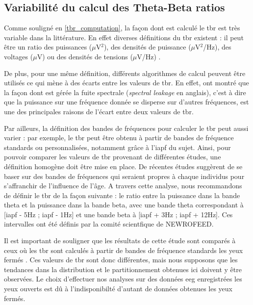 \subsection{Variabilité du calcul des Theta-Beta ratios} 

Comme souligné en \ref{tbr_computation}, la façon dont est calculé le \gls{tbr} est très variable dans la littérature. En effet diverses définitions du \gls{tbr} existent :
il peut être un ratio des puissances ($\mu$V$^2$), des densités de puissance ($\mu$V$^2$/Hz), des voltages ($\mu$V) ou des densités de tensions ($\mu$V/Hz) 
\citep{Liechti2013}. 

De plus, pour une même définition, différents algorithmes de calcul peuvent être utilisés ce qui mène à des écarts entre les valeurs de \gls{tbr}. En 
effet, \citet{Kerson2019} ont montré que la façon dont est gérée la fuite spectrale (\textit{spectral leakage} en anglais), c'est à dire que la puissance
sur une fréquence donnée se disperse sur d'autres fréquences, est une des principales raisons de l'écart entre deux valeurs de \gls{tbr}. 

Par ailleurs, la définition des bandes de fréquences pour calculer le \gls{tbr} peut aussi varier : par exemple, le \gls{tbr} peut être obtenu à partir
de bandes de fréquence standards ou personnalisées, notamment grâce à l'\gls{iapf} du sujet. Ainsi, pour pouvoir comparer les valeurs de \gls{tbr} provenant de différentes
études, une définition homogène doit être mise en place. De récentes études suggèrent de se baser sur des bandes de fréquences 
qui seraient propres à chaque individus \citep{Zhang2017, Saad2018} pour s'affranchir de l'influence de l'âge. A travers cette analyse, nous recommandons de définir le \gls{tbr} de la façon suivante : 
le ratio entre la puissance dans la bande theta et la puissance dans la bande beta, avec une bande theta correspondant à [\gls{iapf} - 5Hz ; \gls{iapf} - 1Hz]
et une bande beta à [\gls{iapf} + 3Hz ; \gls{iapf} + 12Hz]. Ces intervalles ont été définis par la comité scientfique de NEWROFEED. 

Il est important de souligner que les résultats de cette étude sont comparés à ceux où les \gls{tbr} sont calculés à partir de bandes de fréquence standards
les yeux fermés \citep{Zhang2017, Clarke2011}. Ces valeurs de \gls{tbr} sont donc différentes, mais nous supposons que les tendances dans la distribution et le
partitionnement obtenues ici doivent y être observées. Le choix d'effectuer nos analyses sur des données \gls{eeg} enregistrées les yeux ouverts est dû à l'indisponibilté
d'autant de données obtenues les yeux fermés.

